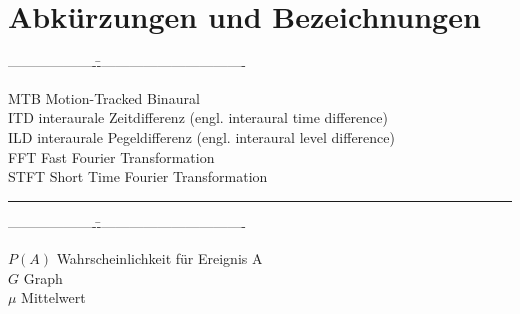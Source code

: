 \chapter*{Abkürzungen und Bezeichnungen}

\thispagestyle{empty}													%

\begin{tabbing}
-------------------\=--------------------------------\kill


MTB     \>Motion-Tracked Binaural\\
ITD     \>interaurale Zeitdifferenz (engl. interaural time difference)\\
ILD     \>interaurale Pegeldifferenz (engl. interaural level difference)\\
FFT     \>Fast Fourier Transformation\\
STFT    \>Short Time Fourier Transformation\\



\end{tabbing}

\rule{10cm}{.3mm}

\begin{tabbing}
-------------------\=--------------------------------\kill

$P(A)$      \>Wahrscheinlichkeit für Ereignis A\\
$G$         \>Graph\\
$\mu$       \>Mittelwert\\

\end{tabbing}
